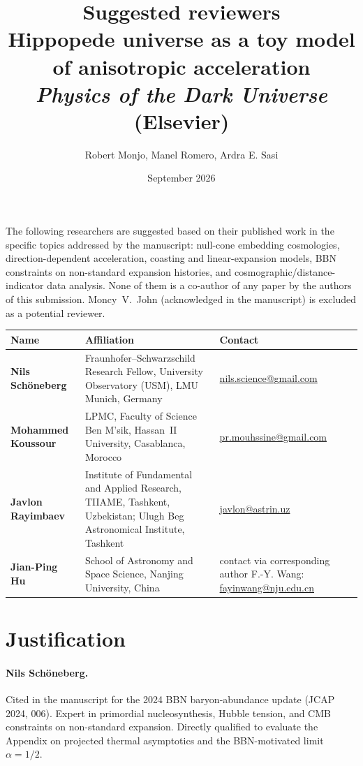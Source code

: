 \documentclass[11pt,a4paper]{article}
\title{\textbf{Suggested reviewers}\\[4pt]
\large Hippopede universe as a toy model of anisotropic acceleration\\
\normalsize \textit{Physics of the Dark Universe} (Elsevier)}
\author{Robert Monjo, Manel Romero, Ardra E. Sasi}
\date{September 2026}
\begin{document}
\maketitle
\thispagestyle{empty}

\noindent The following researchers are suggested based on their published work in the specific
topics addressed by the manuscript: null-cone embedding cosmologies, direction-dependent
acceleration, coasting and linear-expansion models, BBN constraints on non-standard
expansion histories, and cosmographic/distance-indicator data analysis.
None of them is a co-author of any paper by the authors of this submission.
Moncy~V.~John (acknowledged in the manuscript) is excluded as a potential reviewer.

\bigskip

\begin{center}
\renewcommand{\arraystretch}{1.6}
\begin{tabular}{>{\bfseries}p{3.6cm} p{5.8cm} p{4.8cm}}
\toprule
Name & Affiliation & Contact \\
\midrule
Nils Schöneberg
  & Fraunhofer--Schwarzschild Research Fellow,
    University Observatory (USM), LMU Munich, Germany
  & \href{mailto:nils.science@gmail.com}{nils.science@gmail.com} \\
Mohammed Koussour
  & LPMC, Faculty of Science Ben M'sik,
    Hassan~II University, Casablanca, Morocco
  & \href{mailto:pr.mouhssine@gmail.com}{pr.mouhssine@gmail.com} \\
Javlon Rayimbaev
  & Institute of Fundamental and Applied Research,
    TIIAME, Tashkent, Uzbekistan;
    Ulugh Beg Astronomical Institute, Tashkent
  & \href{mailto:javlon@astrin.uz}{javlon@astrin.uz} \\
Jian-Ping Hu
  & School of Astronomy and Space Science,
    Nanjing University, China
  & contact via corresponding author
    F.-Y. Wang:
    \href{mailto:fayinwang@nju.edu.cn}{fayinwang@nju.edu.cn} \\
\bottomrule
\end{tabular}
\end{center}

\bigskip
\section*{Justification}

\paragraph{Nils Schön\-eberg.}
Cited in the manuscript for the 2024 BBN baryon-abundance update
(JCAP 2024, 006). Expert in primordial nucleosynthesis, Hubble tension,
and CMB constraints on non-standard expansion. Directly qualified to
evaluate the Appendix on projected thermal asymptotics and the
BBN-motivated limit $\alpha=1/2$.
\end{document}
